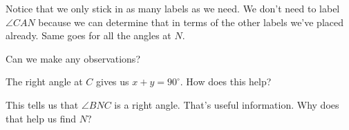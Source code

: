 Notice that we only stick in as many labels as we need. We don't need to label $\angle CAN$ because we can determine that in terms of the other labels we've placed already. Same goes for all the angles at $N.$

Can we make any observations?











The right angle at $C$ gives us $x + y = 90^\circ.$ How does this help?







This tells us that $\angle BNC$ is a right angle. That's useful information. Why does that help us find $N?$

